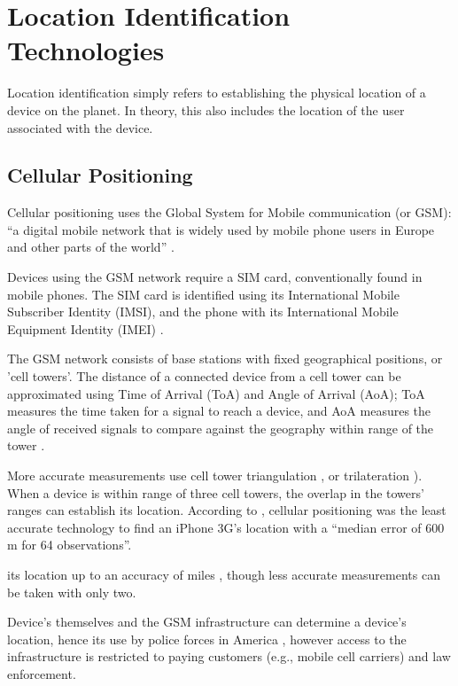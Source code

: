 \section{Location Identification Technologies}

Location identification simply refers to establishing the
physical location of a device on the planet.
In theory, this also includes the location of the user
associated with the device.

\subsection{Cellular Positioning}
\label{ss:cellPos}
Cellular positioning uses the Global System for Mobile
communication (or GSM): \enquote{a digital mobile network
  that is widely used by mobile phone users in Europe and
  other parts of the world} \parencite{whatIsGSM}.

Devices using the GSM network require a SIM card,
conventionally found in mobile phones.
The SIM card is identified using its International Mobile
Subscriber Identity (IMSI), and the phone with its
International Mobile Equipment Identity (IMEI)
\parencite{trackingSuspectByPhone}.

The GSM network consists of base stations with fixed
geographical positions, or 'cell towers'.
The distance of a connected device from a cell tower can be
approximated using Time of Arrival (ToA)\label{t:toa} and
Angle of Arrival (AoA); ToA measures the time taken for a
signal to reach a device, and AoA measures the angle of
received signals to compare against the geography within
range of the tower \parencite{suveryOfCellPos}.

More accurate measurements use cell tower
\gls{triangulation} \parencite{howCellTowerTriWorks}, or
\gls{trilateration} \parencite{suveryOfCellPos}).
When a device is within range of three cell towers, the
overlap in the towers' ranges can establish its location.
According to \cite{locationComparison}, cellular
positioning was the least accurate technology to find an
iPhone 3G's location with a \enquote{median error of 600 m
  for 64 observations}.

its location up to an accuracy of  miles
\parencite{howCellTowerTriWorks}, though less accurate
measurements can be taken with only two.

Device's themselves and the GSM infrastructure can
determine a device's location, hence its use by police
forces in America \parencite{howCellTowerTriWorks}, however
access to the infrastructure is restricted to paying
customers (e.g., mobile cell carriers) and law enforcement.

